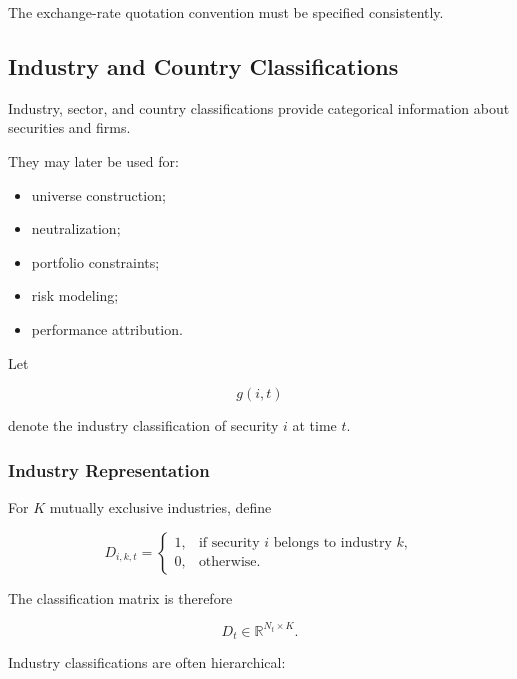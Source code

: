 \documentclass[11pt,a4paper]{article}
\begin{document}
The exchange-rate quotation convention must be specified consistently.


\subsection{Industry and Country Classifications}
\label{subsec:industry_country_classifications}

Industry, sector, and country classifications provide categorical information
about securities and firms.

They may later be used for:

\begin{itemize}
    \item universe construction;
    \item neutralization;
    \item portfolio constraints;
    \item risk modeling;
    \item performance attribution.
\end{itemize}

Let

\begin{equation}
g(i,t)
\end{equation}

denote the industry classification of security $i$ at time $t$.


\subsubsection{Industry Representation}

For $K$ mutually exclusive industries, define

\begin{equation}
D_{i,k,t}
=
\begin{cases}
1,
&
\text{if security }i
\text{ belongs to industry }k,
\\
0,
&
\text{otherwise}.
\end{cases}
\end{equation}

The classification matrix is therefore

\begin{equation}
\boxed{
D_t
\in
\mathbb{R}^{N_t\times K}.
}
\end{equation}

Industry classifications are often hierarchical:
\end{document}
